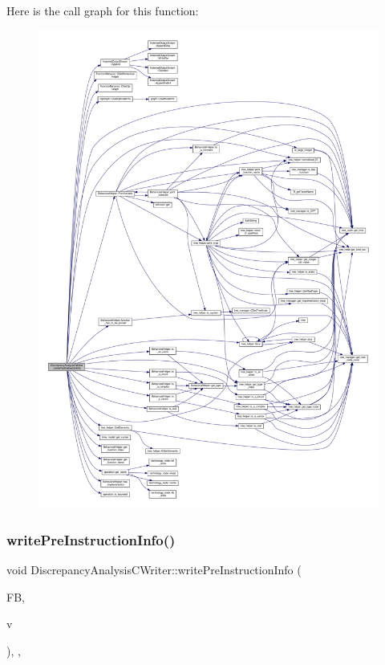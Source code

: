 Here is the call graph for this function\+:
\nopagebreak
\begin{figure}[H]
\begin{center}
\leavevmode
\includegraphics[width=350pt]{d4/d5c/classDiscrepancyAnalysisCWriter_aab973340021c0338599762a89589a588_cgraph}
\end{center}
\end{figure}
\mbox{\label{classDiscrepancyAnalysisCWriter_a891686ef683dad2ed3b99d071f3fb69a}} 
\subsubsection{\texorpdfstring{write\+Pre\+Instruction\+Info()}{writePreInstructionInfo()}}
{\footnotesize\ttfamily void Discrepancy\+Analysis\+C\+Writer\+::write\+Pre\+Instruction\+Info (\begin{DoxyParamCaption}\item[{const \hyperlink{function__behavior_8hpp_a94872da12ed056b6ecf90456164e0213}{Function\+Behavior\+Const\+Ref}}]{FB,  }\item[{const \hyperlink{graph_8hpp_abefdcf0544e601805af44eca032cca14}{vertex}}]{v }\end{DoxyParamCaption})\hspace{0.3cm}{\ttfamily [override]}, {\ttfamily [protected]}, {\ttfamily [virtual]}}



